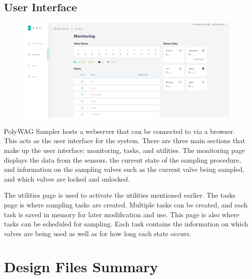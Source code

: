 \documentclass[11pt, letterpaper]{article}
\begin{document}
\subsection{User Interface}

\begin{figure}[H]
	\centering
	\includegraphics[scale=0.35]{./Assets/UI.png}
	\caption{}
\end{figure}

PolyWAG Sampler hosts a webserver that can be connected to via a browser. This acts as the user interface for the system. There are three main sections that make up the user interface: monitoring, tasks, and utilities. The monitoring page displays the data from the sensors, the current state of the sampling procedure, and information on the sampling valves such as the current valve being sampled, and which valves are locked and unlocked. 
\newline\par\noindent

The utilities page is used to activate the utilities mentioned earlier. The tasks page is where sampling tasks are created. Multiple tasks can be created, and each task is saved in memory for later modification and use. This page is also where tasks can be scheduled for sampling. Each task contains the information on which valves are being used as well as for how long each state occurs. 


\section{Design Files Summary}
%
%
\end{document}
